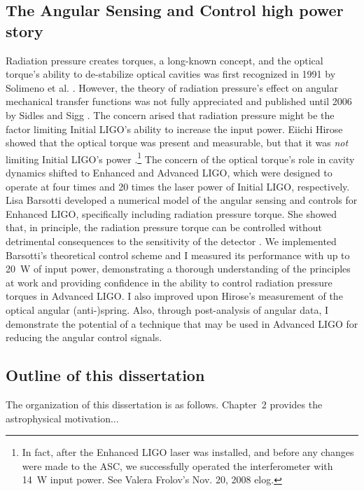 \subsection{The Angular Sensing and Control high power story}
Radiation pressure creates torques, a long-known concept, and the
optical torque's ability to de-stabilize optical cavities was first
recognized in 1991 by Solimeno et
al. \cite{Solimeno1991FabryPerot}. However, the theory of radiation
pressure's effect on angular mechanical transfer functions was not
fully appreciated and published until 2006 by Sidles and Sigg
\cite{Sidles2006Optical}. The concern arised that radiation pressure
might be the factor limiting Initial LIGO's ability to increase the
input power. Eiichi Hirose showed that the optical torque was present
and measurable, but that it was \emph{not} limiting Initial LIGO's
power \cite{Hirose2010Angular}.\footnote{In fact, after the Enhanced
  LIGO laser was installed, and before any changes were made to the
  ASC, we successfully operated the interferometer with 14~W input
  power. See Valera Frolov's Nov. 20, 2008 elog.} The concern of the
optical torque's role in cavity dynamics shifted to Enhanced and
Advanced LIGO, which were designed to operate at four times and 20
times the laser power of Initial LIGO, respectively. Lisa Barsotti
developed a numerical model of the angular sensing and controls for
Enhanced LIGO, specifically including radiation pressure torque. She
showed that, in principle, the radiation pressure torque can be
controlled without detrimental consequences to the sensitivity of the
detector \cite{Barsotti2009Modeling}. We implemented Barsotti's
theoretical control scheme and I measured its performance with up to
20~W of input power, demonstrating a thorough understanding of the
principles at work and providing confidence in the ability to control
radiation pressure torques in Advanced LIGO. I also improved upon
Hirose's measurement of the optical angular (anti-)spring. Also,
through post-analysis of angular data, I demonstrate the potential of
a technique that may be used in Advanced LIGO for reducing the angular
control signals.



\subsection{Outline of this dissertation}
The organization of this
dissertation is as follows. Chapter~2 provides the astrophysical
motivation...



